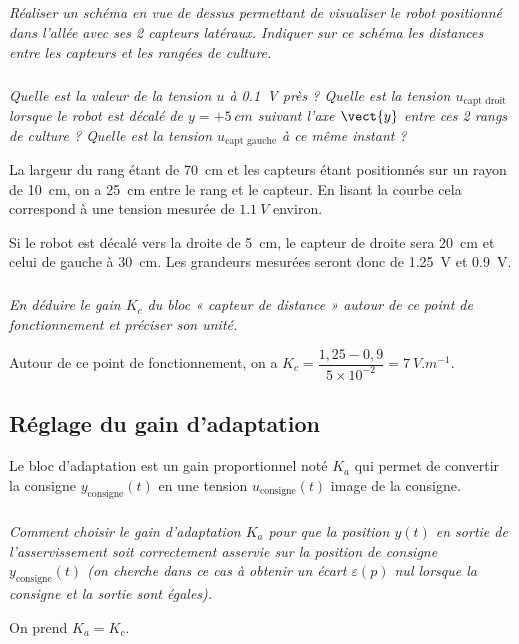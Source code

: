 \begin{multicols}{2}
\fi

\subparagraph{}
\textit{Réaliser un schéma en vue de dessus permettant de visualiser le robot positionné dans l’allée avec ses 2 capteurs latéraux. Indiquer sur ce schéma les distances entre les capteurs et les rangées de culture.}
\ifprof
\begin{corrige}
\end{corrige}
\else
\fi


\subparagraph{}
\textit{Quelle est la valeur de la tension $u$ à \SI{0,1}{V} près ? Quelle est la tension $u_{\text{capt droit}}$ lorsque le robot est décalé de $y = +\SI{5}{cm}$ suivant l’axe $\vect{y}$ entre ces 2 rangs de culture ? Quelle est la tension $u_{\text{capt gauche}}$ à ce même instant ? }
\ifprof
\begin{corrige}
La largeur du rang étant de \SI{70}{cm} et les capteurs étant positionnés sur un rayon de \SI{10}{cm}, on a \SI{25}{cm} entre le rang et le capteur. En lisant la courbe cela correspond à une tension mesurée de $\SI{1,1}{V}$ environ.

Si le robot est décalé vers la droite de \SI{5}{cm}, le capteur de droite sera \SI{20}{cm} et celui de gauche à \SI{30}{cm}. Les grandeurs mesurées seront donc de \SI{1,25}{V} et \SI{0,9}{V}.  
\end{corrige}
\else
\fi


\subparagraph{}
\textit{En déduire le gain $K_c$ du bloc « capteur de distance » autour de ce point de fonctionnement et préciser son unité.}
\ifprof
\begin{corrige}
Autour de ce point de fonctionnement, on a $K_c = \dfrac{1,25-0,9}{5\times 10^{-2}}=\SI{7}{V.m^{-1}}$.
\end{corrige}
\else
\fi


\subsection*{Réglage du gain d’adaptation}

Le bloc d’adaptation est un gain proportionnel noté $K_a$ qui permet de convertir la consigne $y_{\text{consigne}}(t)$ en une tension $u_{\text{consigne}}(t)$ image de la consigne.  



\subparagraph{}
\textit{Comment choisir le gain d’adaptation $K_a$ pour que la position $y(t)$ en sortie de l’asservissement soit correctement asservie sur la position de consigne $y_{\text{consigne}} (t)$ (on cherche dans ce cas à obtenir un écart $\varepsilon(p)$ nul lorsque la consigne et la sortie sont égales).}
\ifprof
\begin{corrige}
On prend $K_a = K_c$. 
\end{corrige}
\else
\fi


\end{multicols}
